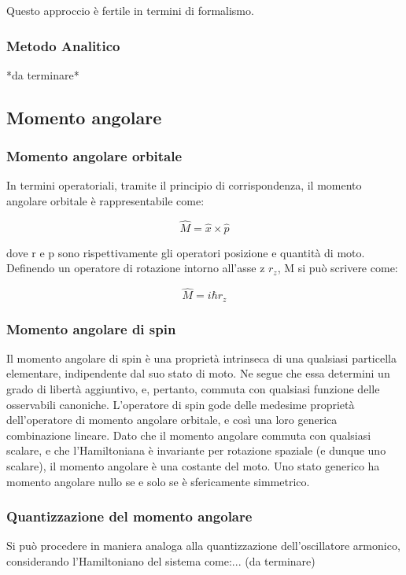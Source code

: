 \documentclass{article}
\begin{document}
Questo approccio è fertile in termini di formalismo.

\subsubsection{Metodo Analitico}
*da terminare*


\subsection{Momento angolare}
\subsubsection{Momento angolare orbitale}
In termini operatoriali, tramite il principio di corrispondenza, il momento angolare orbitale è rappresentabile come:

\begin{equation}
    \hat{M}=\hat{x}\times \hat{p}
\end{equation}

dove r e p sono rispettivamente gli operatori posizione e quantità di moto.
Definendo un operatore di rotazione intorno all'asse z $r_z$, M si può scrivere come:

\begin{equation}
    \hat{M}= i\hbar r_z
\end{equation}

\subsubsection{Momento angolare di spin}
Il momento angolare di spin è una proprietà intrinseca di una qualsiasi particella elementare, indipendente dal suo stato di moto.
Ne segue che essa determini un grado di libertà aggiuntivo, e, pertanto, commuta con qualsiasi funzione delle osservabili canoniche.
L'operatore di spin gode delle medesime proprietà dell'operatore di momento angolare orbitale, e così una loro generica combinazione lineare.
Dato che il momento angolare commuta con qualsiasi scalare, e che l'Hamiltoniana è invariante per rotazione spaziale (e dunque uno scalare), il momento angolare è una costante del moto.
Uno stato generico ha momento angolare nullo se e solo se è sfericamente simmetrico.


\subsubsection{Quantizzazione del momento angolare}
Si può procedere in maniera analoga alla quantizzazione dell'oscillatore armonico, considerando l'Hamiltoniano del sistema come:... (da terminare)
\end{document}

